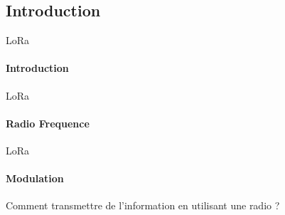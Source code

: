 \subsection{Introduction}

\begin{frame}{LoRa}
\framesubtitle{Introduction}

\end{frame}

\begin{frame}{LoRa}
\framesubtitle{Radio Frequence}
\end{frame}

\begin{frame}{LoRa}
\framesubtitle{Modulation}
\begin{block}{}
{
Comment transmettre de l'information en utilisant une radio ?
}
\end{block}
\vspace{0.5cm}
\end{frame}


